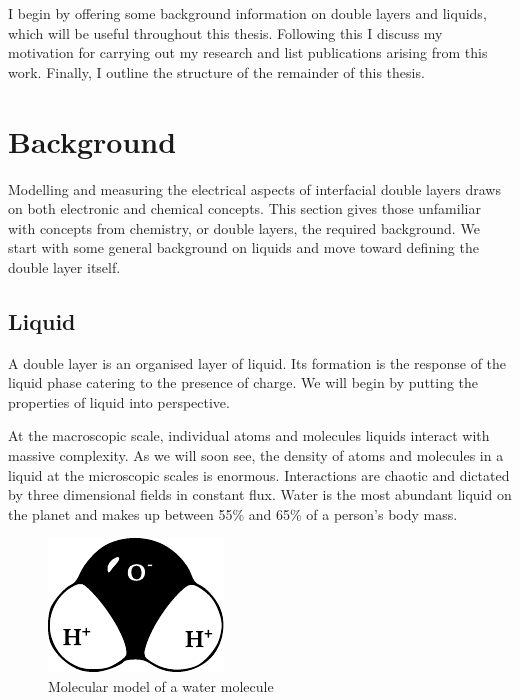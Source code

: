 I begin by offering some background information on double layers and liquids, which will be useful throughout this thesis.
Following this I discuss my motivation for carrying out my research and list publications arising from this work.
Finally, I outline the structure of the remainder of this thesis.

\section{Background}
  Modelling and measuring the electrical aspects of interfacial double layers draws on both electronic and chemical concepts.
  This section gives those unfamiliar with concepts from chemistry, or double layers, the required background.
  We start with some general background on liquids and move toward defining the double layer itself.

  \subsection{Liquid}
    A double layer is an organised layer of liquid.
    Its formation is the response of the liquid phase catering to the presence of charge.
    We will begin by putting the properties of liquid into perspective.

    At the macroscopic scale, individual atoms and molecules liquids interact with massive complexity.
    As we will soon see, the density of atoms and molecules in a liquid at the microscopic scales is enormous.
    Interactions are chaotic and dictated by three dimensional fields in constant flux.
    Water is the most abundant liquid on the planet and makes up between 55\% and 65\% of a person's body mass.

    \begin{figure}
        \begin{center}
            \includegraphics{content/introduction/graphics/polarWater}
        \end{center}
        \caption{Molecular model of a water molecule}
        \label{fig:waterMolecule}
    \end{figure}

